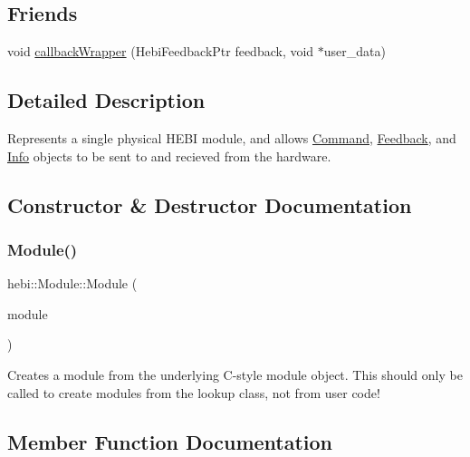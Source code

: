 \subsection*{Friends}
\begin{DoxyCompactItemize}
\item 
void \hyperlink{classhebi_1_1Module_ad4fe704ddfe93cfcff2d81388c2693c5}{callback\+Wrapper} (Hebi\+Feedback\+Ptr feedback, void $\ast$user\+\_\+data)
\end{DoxyCompactItemize}


\subsection{Detailed Description}
Represents a single physical H\+E\+BI module, and allows \hyperlink{classhebi_1_1Command}{Command}, \hyperlink{classhebi_1_1Feedback}{Feedback}, and \hyperlink{classhebi_1_1Info}{Info} objects to be sent to and recieved from the hardware. 

\subsection{Constructor \& Destructor Documentation}
\mbox{\label{classhebi_1_1Module_af8192ddf0477c4bc59f0dd2bd009b08e}} 
\subsubsection{\texorpdfstring{Module()}{Module()}}
{\footnotesize\ttfamily hebi\+::\+Module\+::\+Module (\begin{DoxyParamCaption}\item[{Hebi\+Module\+Ptr}]{module }\end{DoxyParamCaption})}

Creates a module from the underlying C-\/style module object. This should only be called to create modules from the lookup class, not from user code! 

\subsection{Member Function Documentation}
\mbox{\label{classhebi_1_1Module_a7c15d50b692a5f92ec41e7b88bab8680}} 
